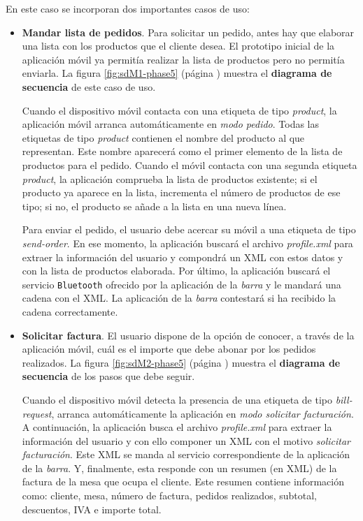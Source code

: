 En este caso se incorporan dos importantes casos de uso:
\begin{itemize}
\item \textbf{Mandar lista de pedidos}. Para solicitar un pedido, antes hay
que elaborar una lista con los productos que el cliente desea. El prototipo
inicial de la aplicación móvil ya permitía realizar la lista de productos
pero no permitía enviarla. La figura \ref{fig:sdM1-phase5} (página
\pageref{fig:sdM1-phase5}) muestra el \textbf{diagrama de secuencia} de este
caso de uso.

Cuando el dispositivo móvil contacta con una etiqueta de tipo \emph{product},
la aplicación móvil arranca automáticamente en \emph{modo pedido}. Todas las
etiquetas de tipo \emph{product} contienen el nombre del producto al que
representan. Este nombre aparecerá como el primer elemento de la lista de
productos para el pedido. Cuando el móvil contacta con una segunda etiqueta
\emph{product}, la aplicación comprueba la lista de productos existente; si
el producto ya aparece en la lista, incrementa el número de productos de ese
tipo; si no, el producto se añade a la lista en una nueva línea.

Para enviar el pedido, el usuario debe acercar su móvil a una etiqueta de
tipo \emph{send-order}. En ese momento, la aplicación buscará el archivo
\emph{profile.xml} para extraer la información del usuario y compondrá un
\acs{XML} con estos datos y con la lista de productos elaborada. Por último,
la aplicación buscará el servicio \texttt{Bluetooth} ofrecido por la aplicación
de la \emph{barra} y le mandará una cadena con el \acs{XML}. La aplicación
de la \emph{barra} contestará si ha recibido la cadena correctamente.

\item \textbf{Solicitar factura}. El usuario dispone de la opción de conocer,
a través de la aplicación móvil, cuál es el importe que debe abonar por los
pedidos realizados. La figura \ref{fig:sdM2-phase5} (página
\pageref{fig:sdM2-phase5}) muestra el \textbf{diagrama de secuencia} de los
pasos que debe seguir.

Cuando el dispositivo móvil detecta la presencia de una etiqueta de tipo
\emph{bill-request}, arranca automáticamente la aplicación en \emph{modo
solicitar facturación}. A continuación, la aplicación busca el archivo
\emph{profile.xml} para extraer la información del usuario y con ello componer
un \acs{XML} con el motivo \emph{solicitar facturación}. Este \acs{XML} se
manda al servicio correspondiente de la aplicación de la \emph{barra}. Y,
finalmente, esta responde con un resumen (en \acs{XML}) de la factura de la 
mesa que ocupa el cliente. Este resumen contiene información como: cliente, 
mesa, número de factura, pedidos realizados, subtotal, descuentos, IVA e
importe total.
\end{itemize}

